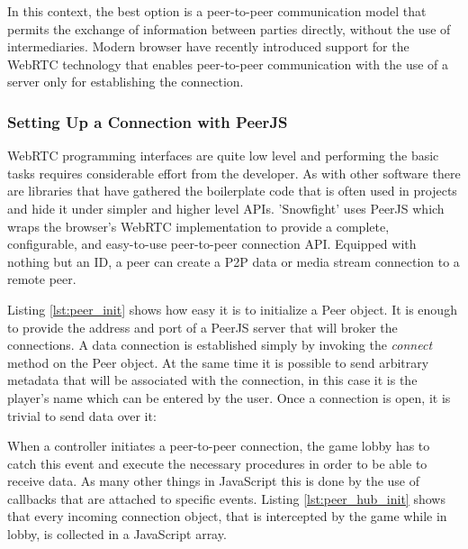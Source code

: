 In this context, the best option is a peer-to-peer communication model that
permits the exchange of information between parties directly, without the use of
intermediaries. Modern browser have recently introduced support for the WebRTC
technology that enables peer-to-peer communication with the use of a server only
for establishing the connection.


\subsubsection{Setting Up a Connection with PeerJS}

WebRTC programming interfaces are quite low level and performing the basic tasks
requires considerable effort from the developer. As with other software there
are libraries that have gathered the boilerplate code that is often used in
projects and hide it under simpler and higher level APIs. 'Snowfight' uses
PeerJS\cite{peerjs} which wraps the browser's WebRTC implementation to provide a complete,
configurable, and easy-to-use peer-to-peer connection API. Equipped with nothing
but an ID, a peer can create a P2P data or media stream connection to a remote
peer.



Listing \ref{lst:peer_init} shows how easy it is to initialize a Peer object. It
is enough to provide the address and port of a PeerJS server that will broker
the connections. A data connection is established simply by invoking the
\emph{connect} method on the Peer object. At the same time it is possible to
send arbitrary metadata that will be associated with the connection, in this
case it is the player's name which can be entered by the user. Once a connection
is open, it is trivial to send data over it:



When a controller initiates a peer-to-peer connection, the game lobby has to
catch this event and execute the necessary procedures in order to be able to
receive data. As many other things in JavaScript this is done by the use of
callbacks that are attached to specific events. Listing \ref{lst:peer_hub_init}
shows that every incoming connection object, that is intercepted by the game
while in lobby, is collected in a JavaScript array.



